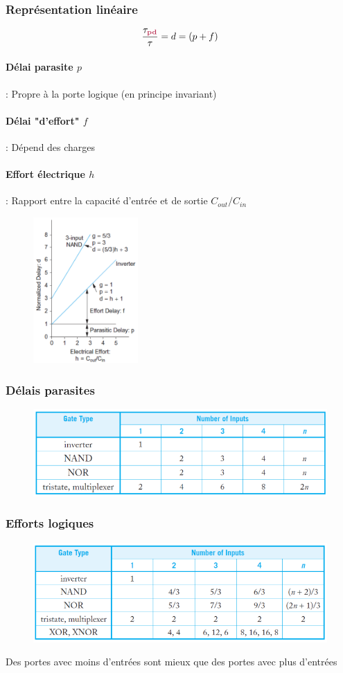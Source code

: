 \documentclass[resume]{subfiles}
\begin{document}
\begin{multicols}{3}
\subsubsection{Représentation linéaire}
$$\frac{\tau_{\pdelay}}{\tau}=d=(p+f)$$
\paragraph{Délai parasite $p$} : Propre à la porte logique (en principe invariant)
\paragraph{Délai "d'effort" $f$} : Dépend des charges
\paragraph{Effort électrique $h$} : Rapport entre la capacité d'entrée et de sortie $C_{out} / C_{in}$

\begin{figure}[H]
\centering
\includegraphics[width=4.00cm]{img_44.png}
\end{figure}
\subsubsection{Délais parasites}
\begin{figure}[H]
\centering
\includegraphics[width=0.9\columnwidth]{img_46.png}
\end{figure}
\subsubsection{Efforts logiques}
\begin{figure}[H]
\centering
\includegraphics[width=0.9\columnwidth]{img_47.png}
\end{figure}
Des portes avec moins d'entrées sont mieux que des portes avec plus d'entrées

\end{multicols}
\end{document}
